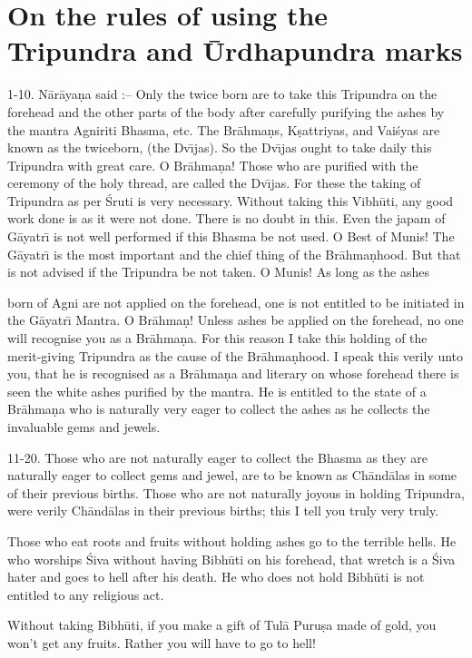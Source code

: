 \chapter{On the rules of using the Tripundra and \=Urdhapundra marks}

1-10. N\=ar\=aya\d{n}a said :-- Only the twice born are to take this Tripundra on the forehead and the other parts of the body after carefully purifying the ashes by the mantra Agniriti Bhasma, etc. The Br\=ahma\d{n}s, K\d{s}attriyas, and Vai\'syas are known as the twiceborn, (the Dv\={\i}jas). So the Dv\={\i}jas ought to take daily this Tripundra with great care. O Br\=ahma\d{n}a! Those who are purified with the ceremony of the holy thread, are called the Dv\={\i}jas. For these the taking of Tripundra as per \'Sruti is very necessary. Without taking this Vibh\=uti, any good work done is as it were not done. There is no doubt in this. Even the japam of G\=ayatr\={\i} is not well performed if this Bhasma be not used. O Best of Munis! The G\=ayatr\={\i} is the most important and the chief thing of the Br\=ahma\d{n}hood. But that is not advised if the Tripundra be not taken. O Munis! As long as the ashes

born of Agni are not applied on the forehead, one is not entitled to be initiated in the G\=ayatr\={\i} Mantra. O Br\=ahma\d{n}! Unless ashes be applied on the forehead, no one will recognise you as a Br\=ahma\d{n}a. For this reason I take this holding of the merit-giving Tripundra as the cause of the Br\=ahma\d{n}hood. I speak this verily unto you, that he is recognised as a Br\=ahma\d{n}a and literary on whose forehead there is seen the white ashes purified by the mantra. He is entitled to the state of a Br\=ahma\d{n}a who is naturally very eager to collect the ashes as he collects the invaluable gems and jewels.

11-20. Those who are not naturally eager to collect the Bhasma as they are naturally eager to collect gems and jewel, are to be known as Ch\=and\=alas in some of their previous births. Those who are not naturally joyous in holding Tripundra, were verily Ch\=and\=alas in their previous births; this I tell you truly very truly.

Those who eat roots and fruits without holding ashes go to the terrible hells. He who worships \'Siva without having Bibh\=uti on his forehead, that wretch is a \'Siva hater and goes to hell after his death. He who does not hold Bibh\=uti is not entitled to any religious act.

Without taking Bibh\=uti, if you make a gift of Tul\=a Puru\d{s}a made of gold, you won't get any fruits. Rather you will have to go to hell!

